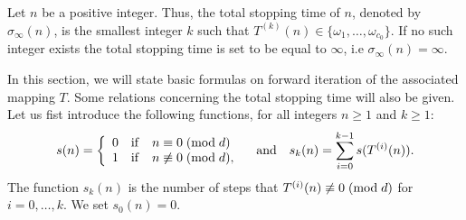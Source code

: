 \documentclass[11pt,a4paper]{article}
\newcommand*\modd[3]{#1\equiv#2\;( {\rm mod}\;  #3)}
\newcommand*\notmodd[3]{#1\not\equiv#2\;( {\rm mod}\;  #3)}
\begin{document}
Let $n$ be a positive integer. Thus, the total stopping time of $n$,  denoted by $\sigma_{\infty}(n)$,  is the smallest  integer $k$ such that  
$T^{(k)}(n)\in\{ \omega_1,\ldots, \omega_{c_0}\}$. If no such integer exists  the total stopping time is set  to be equal to $\infty$, i.e $\sigma_{\infty}(n)=\infty$. 

In this section, we will   state  basic formulas on forward iteration of the   associated mapping $T$.  Some relations  
concerning  the total stopping time
will also be  given.  Let us fist introduce the following functions, for all integers $n\geq 1$ and $k\geq 1$:
$$
s(n)=\left\{\begin{array}{lll}
	0&\mathrm{if}& \modd{n}{0}{d}\\
	1&\mathrm{if}& \notmodd{n}{0}{d},\\
\end{array}\right.
\quad\mathrm{and}\quad
s_k(n)=\sum_{i=0}^{k-1}s(T^{(i)}(n)).$$
The function $s_k(n)$ is the number of steps that  $\notmodd{T^{(i)}(n)}{0}{d}$  for $i=0,\ldots, k$. We set $s_0(n)=0$.
\end{document}
